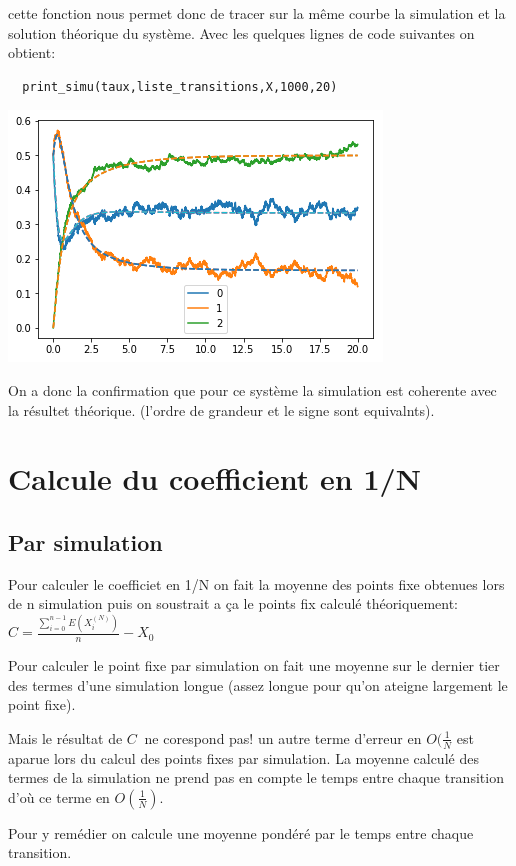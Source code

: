 \documentclass[a4paper]{article}
\begin{document}
cette fonction nous permet donc de tracer sur la même courbe la
simulation et la solution théorique du système.
Avec les quelques lignes de code suivantes on obtient:

\begin{lstlisting}
  print_simu(taux,liste_transitions,X,1000,20)
\end{lstlisting}
\includegraphics{figure2.png}

On a donc la confirmation que pour ce système la simulation est
coherente avec la résultet théorique. (l'ordre de grandeur et le signe
sont equivalnts).

\section{Calcule du coefficient en 1/N}

\subsection{Par simulation}

Pour calculer le coefficiet en 1/N on fait la moyenne des
points fixe obtenues lors de n simulation puis on soustrait a
ça le points fix calculé théoriquement: $C =
\frac{\sum_{i=0}^{n-1}{E(X^{(N)}_i)}}{n}-X_0 \ $

Pour calculer le point fixe par simulation on fait une moyenne sur le
dernier tier des termes d'une simulation longue (assez longue pour
qu'on ateigne largement le point fixe).

Mais le résultat de $C \ $ ne corespond pas! un autre terme d'erreur en
$O(\frac{1}{N}$ est aparue lors du calcul des points fixes par
simulation. La moyenne calculé des termes de la simulation ne prend
pas en compte le temps entre chaque transition d'où ce terme en
$O(\frac{1}{N})$.

Pour y remédier on calcule une moyenne pondéré par le temps entre
chaque transition.
\end{document}
